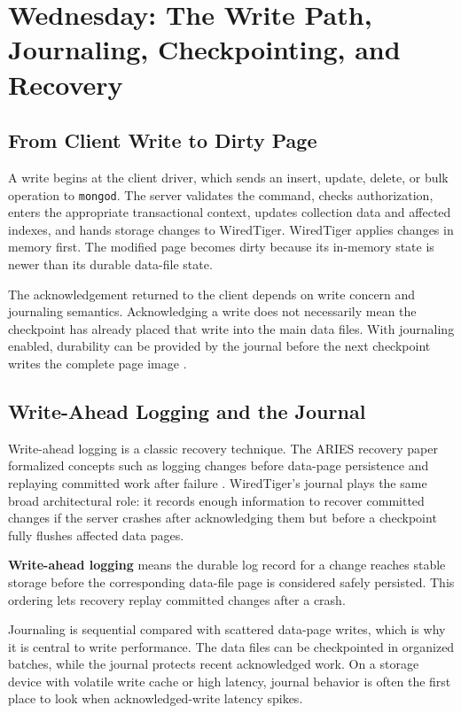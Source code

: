 \section{Wednesday: The Write Path, Journaling, Checkpointing, and Recovery}
\subsection{From Client Write to Dirty Page}
A write begins at the client driver, which sends an insert, update, delete, or bulk operation to \texttt{mongod}. The server validates the command, checks authorization, enters the appropriate transactional context, updates collection data and affected indexes, and hands storage changes to WiredTiger. WiredTiger applies changes in memory first. The modified page becomes dirty because its in-memory state is newer than its durable data-file state.

The acknowledgement returned to the client depends on write concern and journaling semantics. Acknowledging a write does not necessarily mean the checkpoint has already placed that write into the main data files. With journaling enabled, durability can be provided by the journal before the next checkpoint writes the complete page image \cite{mongodbWriteConcernDocs}.

\subsection{Write-Ahead Logging and the Journal}
Write-ahead logging is a classic recovery technique. The ARIES recovery paper formalized concepts such as logging changes before data-page persistence and replaying committed work after failure \cite{mohan1992aries}. WiredTiger's journal plays the same broad architectural role: it records enough information to recover committed changes if the server crashes after acknowledging them but before a checkpoint fully flushes affected data pages.

\begin{definitionbox}
\textbf{Write-ahead logging} means the durable log record for a change reaches stable storage before the corresponding data-file page is considered safely persisted. This ordering lets recovery replay committed changes after a crash.
\end{definitionbox}

Journaling is sequential compared with scattered data-page writes, which is why it is central to write performance. The data files can be checkpointed in organized batches, while the journal protects recent acknowledged work. On a storage device with volatile write cache or high latency, journal behavior is often the first place to look when acknowledged-write latency spikes.

